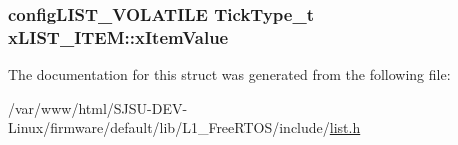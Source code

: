 \subsubsection[{\texorpdfstring{x\+Item\+Value}{xItemValue}}]{ {\bf config\+L\+I\+S\+T\+\_\+\+V\+O\+L\+A\+T\+I\+LE} {\bf Tick\+Type\+\_\+t} x\+L\+I\+S\+T\+\_\+\+I\+T\+E\+M\+::x\+Item\+Value}\hypertarget{structxLIST__ITEM_a9b1f26de79f9da1403ca3ebc7a2e653a}{}\label{structxLIST__ITEM_a9b1f26de79f9da1403ca3ebc7a2e653a}


The documentation for this struct was generated from the following file\+:\begin{DoxyCompactItemize}
\item 
/var/www/html/\+S\+J\+S\+U-\/\+D\+E\+V-\/\+Linux/firmware/default/lib/\+L1\+\_\+\+Free\+R\+T\+O\+S/include/\hyperlink{list_8h}{list.\+h}\end{DoxyCompactItemize}

